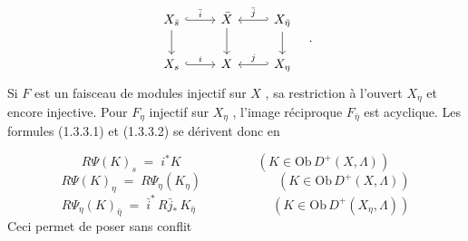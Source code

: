 \begin{equation}\notag
\begin{tikzcd}
X_{\bar{s}} \arrow[r, hook, "\bar{i}"] \arrow[d] & \bar{X} \arrow[d] & X_{\bar{\eta}} \arrow[l, hook', "\bar{j}"'] \arrow[d] \\
X_{s} \arrow[r, hook, "i"] & X & X_{\eta} \arrow[l, hook', "j"']
\end{tikzcd}\quad .
\end{equation}
Si $F$ est un faisceau de modules injectif sur $X$ , sa restriction à l'ouvert $X_{\eta}$ et encore injective. Pour $F_{\eta}$ injectif sur $X_{\eta}$ , l'image réciproque $F_{\bar{\eta}}$ est acyclique. Les formules (1.3.3.1) et (1.3.3.2) se dérivent donc en

\begin{equation}\tag{2.1.2.1}
R\Psi(K)_{s} \;=\; i^{*} K \qquad\qquad\qquad (K \in \mathrm{Ob}\, D^{+}(X, \Lambda))
\end{equation}
\begin{equation}\tag{2.1.2.2}
R\Psi(K)_{\eta} \;=\; R\Psi_{\eta}(K_{\eta}) \qquad\qquad\qquad (K \in \mathrm{Ob}\, D^{+}(X, \Lambda))
\end{equation}
\begin{equation}\tag{2.1.2.3}
R\Psi_{\eta}(K)_{\bar{\eta}} \;=\; \bar{i}^{*}\, R\bar{j}_{*}\, K_{\bar{\eta}} \qquad\qquad\qquad (K \in \mathrm{Ob}\, D^{+}(X_{\eta}, \Lambda))
\end{equation}
Ceci permet de poser sans conflit

